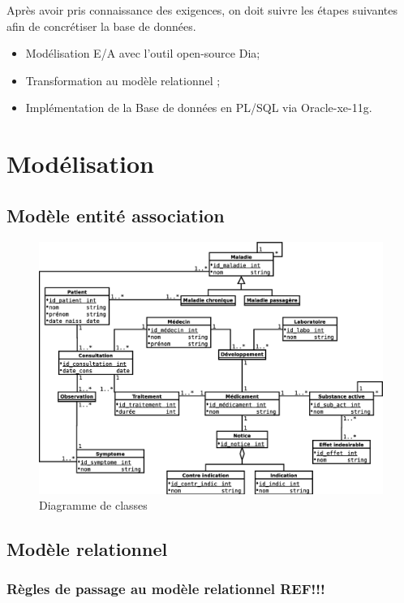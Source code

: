 \documentclass[12pt,a4paper]{article}
\begin{document}
Après avoir pris connaissance des exigences, on doit suivre les étapes suivantes afin de concrétiser la base de données.

\begin{itemize}

\item Modélisation E/A avec l'outil open-source Dia;
\item Transformation au modèle relationnel ;
\item Implémentation de la Base de données en PL/SQL via Oracle-xe-11g.

\end{itemize}


\section{Modélisation}
\subsection{Modèle entité association}

\begin{figure}[H]
	\centering
	\includegraphics[width=1\linewidth]{er}
	\caption{Diagramme de classes}
	\label{fig:er}
\end{figure}





\subsection{Modèle relationnel}

\subsubsection{Règles de passage au modèle relationnel REF!!!}
\end{document}
